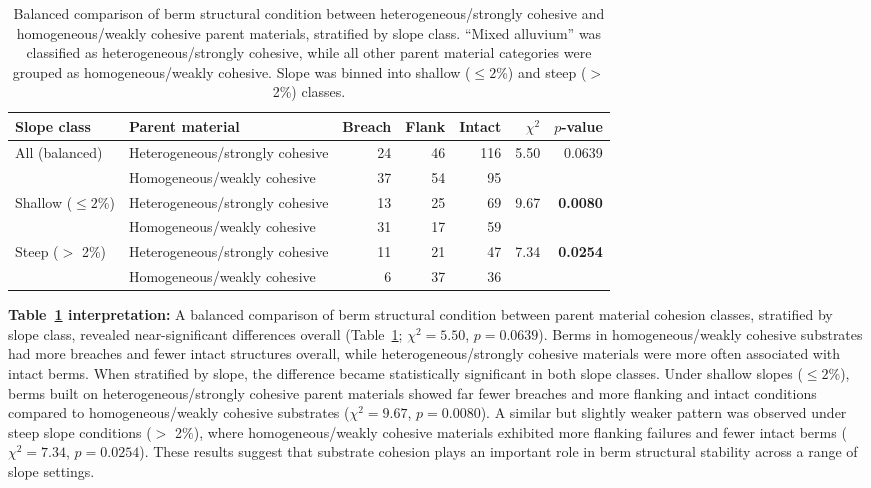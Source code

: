 \documentclass[review]{elsarticle}
\begin{document}
\begin{table}[h!]
\centering
\caption{\normalsize Balanced comparison of berm structural condition between heterogeneous/strongly cohesive and homogeneous/weakly cohesive parent materials, stratified by slope class. ``Mixed alluvium'' was classified as heterogeneous/strongly cohesive, while all other parent material categories were grouped as homogeneous/weakly cohesive. Slope was binned into shallow ($\leq 2$\%) and steep ($>$ 2\%) classes.}
\small
\begin{tabular}{|l|l|r|r|r|r|r|}
\hline
\textbf{Slope class} & \textbf{Parent material} & \textbf{Breach} & \textbf{Flank} & \textbf{Intact} & \textbf{$\chi^2$} & \textbf{$p$-value} \\
\hline
\multirow{2}{*}{All (balanced)} & Heterogeneous/strongly cohesive & 24 & 46 & 116 & \multirow{2}{*}{5.50} & \multirow{2}{*}{0.0639} \\
& Homogeneous/weakly cohesive & 37 & 54 & 95 & & \\
\hline
\multirow{2}{*}{Shallow ($\leq 2$\%)} & Heterogeneous/strongly cohesive & 13 & 25 & 69 & \multirow{2}{*}{9.67} & \multirow{2}{*}{\textbf{0.0080}} \\
& Homogeneous/weakly cohesive & 31 & 17 & 59 & & \\
\hline
\multirow{2}{*}{Steep ($>$ 2\%)} & Heterogeneous/strongly cohesive & 11 & 21 & 47 & \multirow{2}{*}{7.34} & \multirow{2}{*}{\textbf{0.0254}} \\
& Homogeneous/weakly cohesive & 6 & 37 & 36 & & \\
\hline
\end{tabular}
\label{tab:parentmat_slope_chi}
\end{table}

\textbf{Table~\ref{tab:parentmat_slope_chi} interpretation:} A balanced comparison of berm structural condition between parent material cohesion classes, stratified by slope class, revealed near-significant differences overall (Table~\ref{tab:parentmat_slope_chi}; $\chi^2 = 5.50$, $p = 0.0639$). Berms in homogeneous/weakly cohesive substrates had more breaches and fewer intact structures overall, while heterogeneous/strongly cohesive materials were more often associated with intact berms. When stratified by slope, the difference became statistically significant in both slope classes. Under shallow slopes ($\leq 2$\%), berms built on heterogeneous/strongly cohesive parent materials showed far fewer breaches and more flanking and intact conditions compared to homogeneous/weakly cohesive substrates ($\chi^2 = 9.67$, $p = 0.0080$). A similar but slightly weaker pattern was observed under steep slope conditions ($>$ 2\%), where homogeneous/weakly cohesive materials exhibited more flanking failures and fewer intact berms ($\chi^2 = 7.34$, $p = 0.0254$). These results suggest that substrate cohesion plays an important role in berm structural stability across a range of slope settings.
\end{document}

